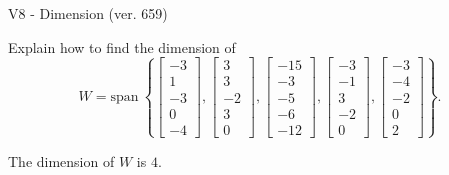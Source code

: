 \begin{exercise}
  \begin{exerciseTitle}V8 - Dimension (ver. 659)\end{exerciseTitle}
  \begin{exerciseStatement}
    Explain how to find the dimension of 
\[W=\mathrm{span}\ \left\{\left[\begin{array}{r}
-3 \\
1 \\
-3 \\
0 \\
-4
\end{array}\right] , \left[\begin{array}{r}
3 \\
3 \\
-2 \\
3 \\
0
\end{array}\right] , \left[\begin{array}{r}
-15 \\
-3 \\
-5 \\
-6 \\
-12
\end{array}\right] , \left[\begin{array}{r}
-3 \\
-1 \\
3 \\
-2 \\
0
\end{array}\right] , \left[\begin{array}{r}
-3 \\
-4 \\
-2 \\
0 \\
2
\end{array}\right]\right\}.\]



  \end{exerciseStatement}
  \begin{exerciseAnswer}
   The dimension of \(W\) is  \(4\).
  


  \end{exerciseAnswer}
\end{exercise}